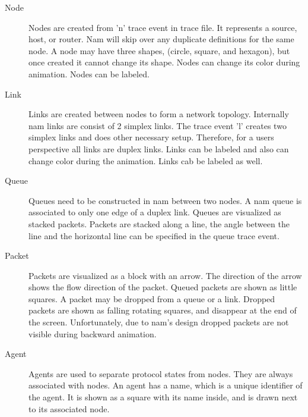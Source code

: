 \begin{description}
\item[Node]
Nodes are created from 'n' trace event in trace file. It represents a source, host, or router. Nam will skip over any duplicate definitions for the same node. A node may have three shapes, (circle, square, and hexagon), but once created it cannot change its shape. Nodes can change its color during animation. Nodes can be labeled.

\item[Link]
Links are created between nodes to form a network topology. Internally nam links are consist of 2 simplex links. The trace event 'l' creates two simplex links and does other necessary setup. Therefore, for a users perspective all links are duplex links.  Links can be labeled and also can change color during the animation. Links cab be labeled as well.

\item[Queue]
Queues need to be constructed in nam between two nodes. A nam queue is associated to only one edge of a duplex link. Queues are visualized as stacked packets.  Packets are stacked along a line, the angle between the line and the horizontal line can be specified in the queue trace event.

\item[Packet]
Packets are visualized as a block with an arrow. The direction of the arrow shows the flow direction of the packet. Queued packets are shown as little squares. A packet may be dropped from a queue or a link. Dropped packets are shown as falling rotating squares, and disappear at the end of the screen.  Unfortunately, due to nam's design dropped packets are not visible during backward animation.

\item[Agent]
Agents are used to separate protocol states from nodes. They are always associated with nodes. An agent has a name, which is a unique identifier of the agent. It is shown as a square with its name inside, and is drawn next to its associated node.
\end{description}

